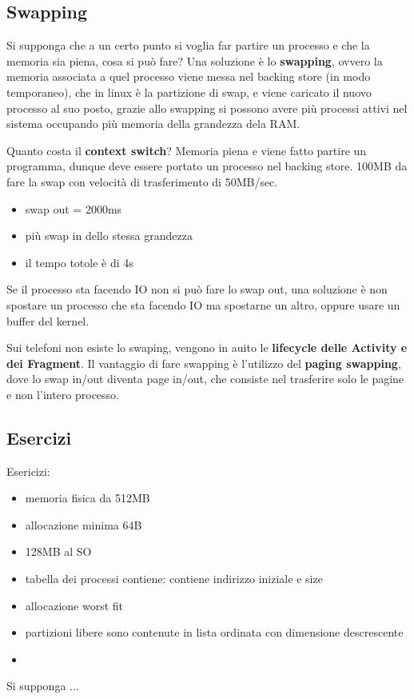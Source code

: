 \documentclass[12pt]{article}
\begin{document}
\subsection{Swapping}
Si supponga che a un certo punto si voglia far partire un processo e che la memoria sia piena, cosa si pu\`o fare? Una soluzione \`e lo \textbf{swapping}, ovvero la memoria associata a quel processo viene messa nel backing store (in modo temporaneo), che in linux \`e la partizione di swap, e viene caricato il nuovo processo al suo posto, grazie allo swapping si possono avere pi\`u processi attivi nel sistema occupando pi\`u memoria della grandezza dela RAM.
\begin{example}{}{}
  Quanto costa il \textbf{context switch}? Memoria piena e viene fatto partire un programma, dunque deve essere portato un processo nel backing store. 100MB da fare la swap con velocit\`a di trasferimento di 50MB/sec.
  \begin{itemize}
    \item swap out = 2000ms
    \item pi\`u swap in dello stessa grandezza
    \item il tempo totole \`e di 4s
  \end{itemize}
  Se il processo sta facendo IO non si pu\`o fare lo swap out, una soluzione \`e non spostare un processo che sta facendo IO ma spostarne un altro, oppure usare un buffer del kernel.
\end{example}
Sui telefoni non esiste lo swaping, vengono in auito le \textbf{lifecycle delle Activity e dei Fragment}. Il vantaggio di fare swapping \`e l'utilizzo del \textbf{paging swapping}, dove lo swap in/out diventa page in/out, che consiste nel trasferire solo le pagine e non l'intero processo.

\subsection{Esercizi}
Esericizi:
\begin{example}{}{}
  \begin{itemize}
    \item memoria fisica da 512MB
    \item allocazione minima 64B
    \item 128MB al SO
    \item tabella dei processi contiene: contiene indirizzo iniziale e size
    \item allocazione worst fit
    \item partizioni libere sono contenute in lista ordinata con dimensione descrescente
    \item 
  \end{itemize}
  Si supponga ...
\end{example}
\end{document}
